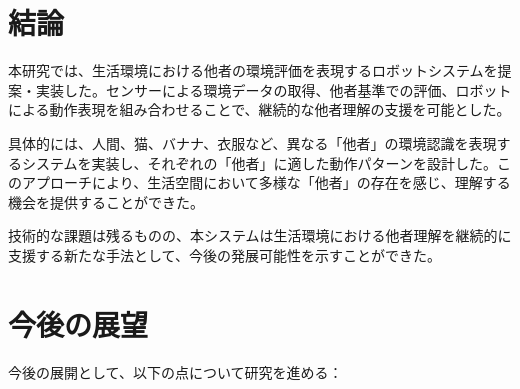 \documentclass{cuxarticle}
\begin{document}
\section{結論}
本研究では、生活環境における他者の環境評価を表現するロボットシステムを提案・実装した。センサーによる環境データの取得、他者基準での評価、ロボットによる動作表現を組み合わせることで、継続的な他者理解の支援を可能とした。

具体的には、人間、猫、バナナ、衣服など、異なる「他者」の環境認識を表現するシステムを実装し、それぞれの「他者」に適した動作パターンを設計した。このアプローチにより、生活空間において多様な「他者」の存在を感じ、理解する機会を提供することができた。

技術的な課題は残るものの、本システムは生活環境における他者理解を継続的に支援する新たな手法として、今後の発展可能性を示すことができた。

\section{今後の展望}
今後の展開として、以下の点について研究を進める：
\end{document}
